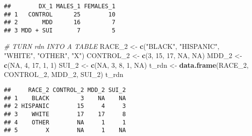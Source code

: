 \documentclass[]{article}
\newenvironment{Shaded}{\begin{snugshade}}{\end{snugshade}}
\newcommand{\CommentTok}[1]{\textcolor[rgb]{0.56,0.35,0.01}{\textit{#1}}}
\newcommand{\DecValTok}[1]{\textcolor[rgb]{0.00,0.00,0.81}{#1}}
\newcommand{\KeywordTok}[1]{\textcolor[rgb]{0.13,0.29,0.53}{\textbf{#1}}}
\newcommand{\NormalTok}[1]{#1}
\newcommand{\OperatorTok}[1]{\textcolor[rgb]{0.81,0.36,0.00}{\textbf{#1}}}
\newcommand{\OtherTok}[1]{\textcolor[rgb]{0.56,0.35,0.01}{#1}}
\newcommand{\StringTok}[1]{\textcolor[rgb]{0.31,0.60,0.02}{#1}}
\begin{document}
\begin{Shaded}
\end{Shaded}

\begin{verbatim}
##        DX_1 MALES_1 FEMALES_1
## 1   CONTROL      25        10
## 2       MDD      16         7
## 3 MDD + SUI       7         5
\end{verbatim}

\begin{Shaded}
\begin{Highlighting}[]
\CommentTok{# TURN rdn INTO A TABLE}
\NormalTok{RACE_}\DecValTok{2}\NormalTok{ <-}\StringTok{ }\KeywordTok{c}\NormalTok{(}\StringTok{"BLACK"}\NormalTok{, }\StringTok{"HISPANIC"}\NormalTok{, }\StringTok{"WHITE"}\NormalTok{, }\StringTok{"OTHER"}\NormalTok{, }\StringTok{"X"}\NormalTok{)}
\NormalTok{CONTROL_}\DecValTok{2}\NormalTok{ <-}\StringTok{ }\KeywordTok{c}\NormalTok{(}\DecValTok{3}\NormalTok{, }\DecValTok{15}\NormalTok{, }\DecValTok{17}\NormalTok{, }\OtherTok{NA}\NormalTok{, }\OtherTok{NA}\NormalTok{)}
\NormalTok{MDD_}\DecValTok{2}\NormalTok{ <-}\StringTok{ }\KeywordTok{c}\NormalTok{(}\OtherTok{NA}\NormalTok{, }\DecValTok{4}\NormalTok{, }\DecValTok{17}\NormalTok{, }\DecValTok{1}\NormalTok{, }\DecValTok{1}\NormalTok{)}
\NormalTok{SUI_}\DecValTok{2}\NormalTok{ <-}\StringTok{ }\KeywordTok{c}\NormalTok{(}\OtherTok{NA}\NormalTok{, }\DecValTok{3}\NormalTok{, }\DecValTok{8}\NormalTok{, }\DecValTok{1}\NormalTok{, }\OtherTok{NA}\NormalTok{)}
\NormalTok{t_rdn <-}\StringTok{ }\KeywordTok{data.frame}\NormalTok{(RACE_}\DecValTok{2}\NormalTok{, CONTROL_}\DecValTok{2}\NormalTok{, MDD_}\DecValTok{2}\NormalTok{, SUI_}\DecValTok{2}\NormalTok{)}
\NormalTok{t_rdn}
\end{Highlighting}
\end{Shaded}

\begin{verbatim}
##     RACE_2 CONTROL_2 MDD_2 SUI_2
## 1    BLACK         3    NA    NA
## 2 HISPANIC        15     4     3
## 3    WHITE        17    17     8
## 4    OTHER        NA     1     1
## 5        X        NA     1    NA
\end{verbatim}
\end{document}
